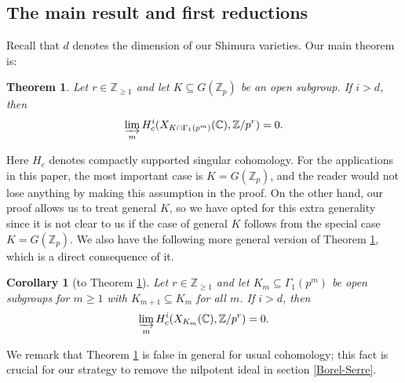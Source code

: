 \documentclass{amsart}
\newtheorem{thm}[subsubsection]{Theorem}
\newtheorem{cor}[subsubsection]{Corollary}
\theoremstyle{remark}
\numberwithin{equation}{subsection}
\def\C{\CC}
\newcommand{\Z}{\ZZ}
\newcommand{\CC}{{\mathbb C}}
\newcommand{\ZZ}{{\mathbb Z}}
\newcommand{\Zp}{\Z_p}
\newcommand{\sub}{\subseteq}
\renewcommand{\(}{\left(}
\renewcommand{\)}{\right)}
\begin{document}
\subsection{The main result and first reductions}\label{subsect:first-reductions}

Recall that $d$ denotes the dimension of our Shimura varieties. Our main theorem is:

\begin{thm}\label{main thm} Let $r\in \Z_{\geq 1}$ and let $K \sub G(\Zp)$ be an open subgroup. If $i>d$, then 
\[
 \varinjlim_{m} H^{i}_{c}(X_{K \cap \Gamma_1(p^{m})}(\C),\Z/p^r)=0.
 \]
\end{thm}

\noindent Here $H_{c}$ denotes compactly supported singular cohomology. For the applications in this paper, the most important case is $K = G(\Zp)$, and the reader would not lose anything by making this assumption in the proof. On the other hand, our proof allows us to treat general $K$, so we have opted for this extra generality since it is not clear to us if the case of general $K$ follows from the special case $K = G(\Zp)$. We also have the following more general version of Theorem \ref{main thm}, which is a direct consequence of it.

\begin{cor}[to Theorem \ref{main thm}]\label{cor to main}
Let $r\in \Z_{\geq 1}$ and let $K_{m} \sub \Gamma_1(p^{m})$ be open subgroups for $m \geq 1$  with $K_{m+1}\sub K_{m}$ for all $m$. If $i>d$, then 
\[
 \varinjlim_{m} H^{i}_{c}(X_{K_{m}}(\C),\Z/p^r)=0.
 \]
\end{cor}

\noindent We remark that Theorem \ref{main thm} is false in general for usual cohomology; this fact is crucial for our strategy to remove the nilpotent ideal in section \ref{Borel-Serre}.

\medskip
\end{document}
